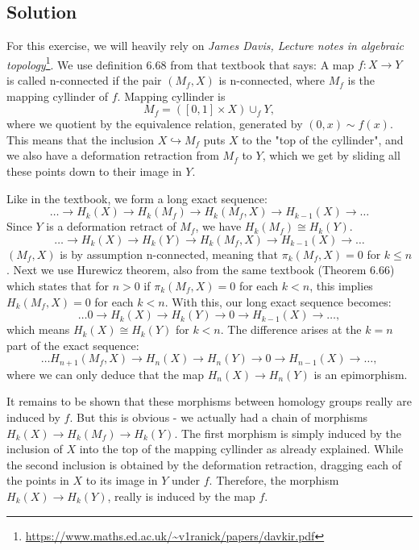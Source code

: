 \documentclass{article}
\begin{document}
\subsection*{Solution}
For this exercise, we will heavily rely on \textit{James Davis, Lecture notes in algebraic topology}\footnote{\url{https://www.maths.ed.ac.uk/~v1ranick/papers/davkir.pdf}}. We use definition 6.68 from that textbook that says:
A map $f: X \to Y$ is called n-connected if the pair $(M_f, X)$ is n-connected, where $M_f$ is the mapping cyllinder of $f$.
Mapping cyllinder is 
\begin{equation*}
M_f = ([0,1] \times X) \cup_f Y,
\end{equation*}
where we quotient by the equivalence relation, generated by $(0,x) \sim f(x)$.
This means that the inclusion $X \hookrightarrow M_f$ puts $X$ to the "{}top of the cyllinder"{}, and we also have a deformation retraction from $M_f$ to $Y$, which we get by sliding all these points down to their image in $Y$.

Like in the textbook, we form a long exact sequence:
\begin{equation*}
\dots \to H_k(X) \to H_k(M_f) \to H_k(M_f,X) \to H_{k-1}(X) \to \dots
\end{equation*}
Since $Y$ is a deformation retract of $M_f$, we have $H_k(M_f) \cong H_k(Y)$.
\begin{equation*}
\dots \to H_k(X) \to H_k(Y) \to H_k(M_f,X) \to H_{k-1}(X) \to \dots
\end{equation*}
$(M_f,X)$ is by assumption n-connected, meaning that $\pi_k(M_f,X) = 0$ for $k \leq n$.
Next we use Hurewicz theorem, also from the same textbook (Theorem 6.66) which states that for $n>0$ if  $\pi_k(M_f,X) = 0$ for each $k<n$, this implies $H_k(M_f,X) = 0$ for each $k<n$. With this, our long exact sequence becomes:
\begin{equation*}
\dots 0 \to H_k(X) \to H_k(Y) \to 0 \to H_{k-1}(X) \to \dots,
\end{equation*}
which means $H_k(X) \cong H_k(Y)$ for $k<n$. The difference arises at the $k=n$ part of the exact sequence:
\begin{equation*}
\dots H_{n+1}(M_f,X) \to H_n(X) \to H_n(Y) \to 0 \to H_{n-1}(X) \to \dots,
\end{equation*}
where we can only deduce that the map $H_n(X) \to H_n(Y)$ is an epimorphism.

It remains to be shown that these morphisms between homology groups really are induced by $f$. But this is obvious - we actually had a chain of morphisms $H_k(X) \to H_k(M_f) \to H_k(Y)$. The first morphism is simply induced by the inclusion of $X$ into the top of the mapping cyllinder as already explained. While the second inclusion is obtained by the deformation retraction, dragging each of the points in $X$ to its image in $Y$ under $f$. Therefore, the morphism $H_k(X) \to H_k(Y)$, really is induced by the map $f$.
\newpage
\end{document}
